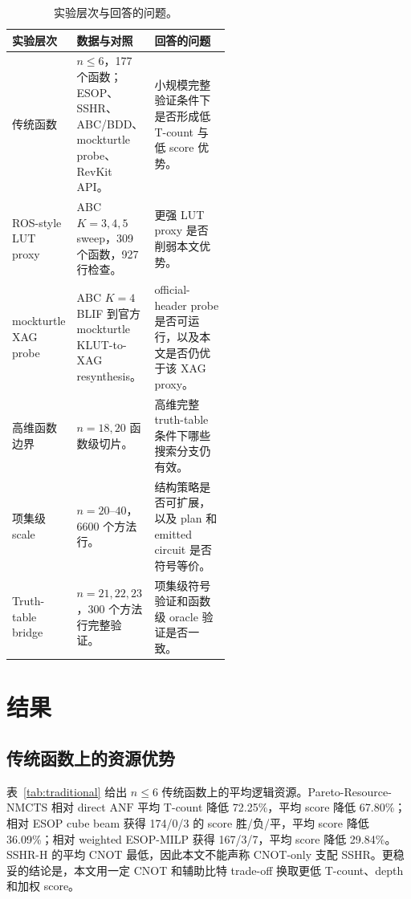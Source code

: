 \documentclass[UTF8,fontset=macnew,11pt]{ctexart}
\newcommand{\method}{Resource-NMCTS}
\newcommand{\anf}{\ensuremath{\mathrm{ANF}}}
\begin{document}
\begin{table}[H]
\centering
\scriptsize
\caption{实验层次与回答的问题。}
\label{tab:experiment-layers}
\begin{tabularx}{\linewidth}{>{\raggedright\arraybackslash}p{0.23\linewidth}>{\raggedright\arraybackslash}p{0.31\linewidth}>{\raggedright\arraybackslash}X}
\toprule
实验层次 & 数据与对照 & 回答的问题 \\
\midrule
传统函数 & $n\leq6$，177 个函数；ESOP、SSHR、ABC/BDD、mockturtle probe、RevKit API。 & 小规模完整验证条件下是否形成低 T-count 与低 score 优势。 \\
ROS-style LUT proxy & ABC $K=3,4,5$ sweep，309 个函数，927 行检查。 & 更强 LUT proxy 是否削弱本文优势。 \\
mockturtle XAG probe & ABC $K=4$ BLIF 到官方 mockturtle KLUT-to-XAG resynthesis。 & official-header probe 是否可运行，以及本文是否仍优于该 XAG proxy。 \\
高维函数边界 & $n=18,20$ 函数级切片。 & 高维完整 truth-table 条件下哪些搜索分支仍有效。 \\
项集级 scale & $n=20$--$40$，6600 个方法行。 & 结构策略是否可扩展，以及 plan 和 emitted circuit 是否符号等价。 \\
Truth-table bridge & $n=21,22,23$，300 个方法行完整验证。 & 项集级符号验证和函数级 oracle 验证是否一致。 \\
\bottomrule
\end{tabularx}
\end{table}

\section{结果}

\subsection{传统函数上的资源优势}

表~\ref{tab:traditional} 给出 $n\leq6$ 传统函数上的平均逻辑资源。Pareto-\method{} 相对 direct \anf{} 平均 T-count 降低 72.25\%，平均 score 降低 67.80\%；相对 ESOP cube beam 获得 174/0/3 的 score 胜/负/平，平均 score 降低 36.09\%；相对 weighted ESOP-MILP 获得 167/3/7，平均 score 降低 29.84\%。SSHR-H 的平均 CNOT 最低，因此本文不能声称 CNOT-only 支配 SSHR。更稳妥的结论是，本文用一定 CNOT 和辅助比特 trade-off 换取更低 T-count、depth 和加权 score。
\end{document}

